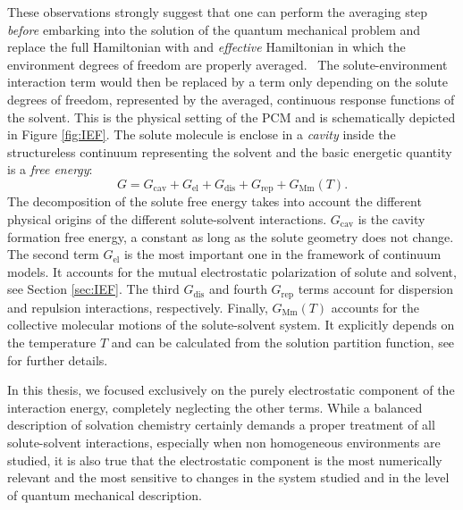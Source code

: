 These observations strongly suggest that one can perform the averaging
step \emph{before} embarking into the solution of the quantum mechanical
problem and replace the full Hamiltonian with and \emph{effective}
Hamiltonian in which the environment degrees of freedom are properly
averaged.~\autocite{Angyan1992-vo, Tapia1992-pu}
The solute-environment interaction term would then be replaced by
a term only depending on the solute degrees of freedom, represented by
the averaged, continuous response functions of the solvent.
This is the physical setting of the \gls{PCM} and is schematically
depicted in Figure \ref{fig:IEF}.
The solute molecule is enclose in a \emph{cavity} inside the
structureless continuum representing the solvent and the basic energetic
quantity is a \emph{free energy}:\autocite{Tomasi1994-gv,
Amovilli1998-pv, Tomasi2005-vm}
\begin{equation}\label{eq:free-energy}
 G = G_\mathrm{cav} + G_\mathrm{el} + G_\mathrm{dis} + G_\mathrm{rep} + G_\mathrm{Mm}(T).
\end{equation}
The decomposition of the solute free energy takes into account the
different physical origins of the different solute-solvent interactions.
$G_\mathrm{cav}$ is the cavity formation free energy, a constant as long
as the solute geometry does not change.\autocite{Tomasi1994-gv,
Floris1997-tu}
The second term $G_\mathrm{el}$ is the most important one in the
framework of continuum models. It accounts for the mutual electrostatic
polarization of solute and solvent, see Section \ref{sec:IEF}.
The third $G_\mathrm{dis}$ and fourth $G_\mathrm{rep}$ terms account for
dispersion and repulsion interactions,
respectively.\autocite{Amovilli1997-fo, Weijo2010-jy}
Finally, $G_\mathrm{Mm}(T)$ accounts for the collective molecular
motions of the solute-solvent system. It explicitly depends on the
temperature $T$ and can be calculated from the solution partition
function, see  for further details.

In this thesis, we focused exclusively on the purely electrostatic
component of the interaction energy, completely neglecting the other
terms.
While a balanced description of solvation chemistry certainly demands
a proper treatment of all solute-solvent interactions, especially when
non homogeneous environments are studied,\autocite{Mozgawa2014-ad,
Mozgawa2016-wf} it is also true that the electrostatic component is the
most numerically relevant and the most sensitive to changes in the
system studied and in the level of quantum mechanical description.


